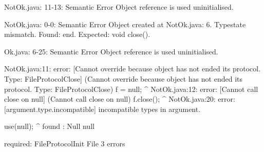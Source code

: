 \lstset{language=,caption=Original Mungo output}
\begin{code}

NotOk.java: 11-13: Semantic Error
		Object reference is used uninitialised.

NotOk.java: 0-0: Semantic Error
		Object created at NotOk.java: 6. Typestate mismatch. Found: end. Expected: void close().

Ok.java: 6-25: Semantic Error
		Object reference is used uninitialised.
\end{code}

\lstset{language=,caption=New Mungo output}
\begin{code}
NotOk.java:11: error: [Cannot override because object has not ended its protocol. Type: FileProtocol{Close}] (Cannot override because object has not ended its protocol. Type: FileProtocol{Close})
        f = null;
        ^
NotOk.java:12: error: [Cannot call close on null] (Cannot call close on null)
        f.close();
               ^
NotOk.java:20: error: [argument.type.incompatible] incompatible types in argument.

    use(null);
        ^
  found   : Null null

  required: FileProtocol{Init} File
3 errors
\end{code}

